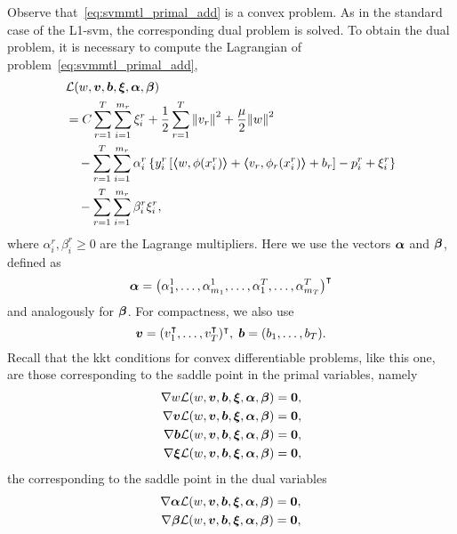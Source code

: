 Observe that~\eqref{eq:svmmtl_primal_add} is a convex problem. As in the standard case of the L1-\acrshort{svm}, the corresponding dual problem is solved. To obtain the dual problem, it is necessary to compute the Lagrangian of problem~\eqref{eq:svmmtl_primal_add},
\begin{equation}\label{eq:svmmtl_lagrangian_add}
    \begin{aligned}
        & \lagr({w}, \fv{v}, \fv{b}, \fv{\xi}, \fv{\alpha}, \fv{\beta}) \\
        &= C \sum_{r= 1}^T \sum_{i=1}^{m_r} {\xi_{i}^r} + \frac{1}{2} \sum_{r= 1}^T{\norm{{v}_r}^2} + \frac{\mu}{2} {\norm{{w}}}^2 \\
        &\quad -  \sum_{r= 1}^T \sum_{i=1}^{m_r} \alpha_i^r \left\lbrace y_{i}^r \left[ \dotp{w}{\phi(x_{i}^r)} + \dotp{{v}_r}{\phi_r(x_{i}^r)} + b_r \right] - p_{i}^r + \xi_{i}^r  \right\rbrace \\
        &\quad -  \sum_{r= 1}^T \sum_{i=1}^{m_r} \beta_i^r \xi_i^r ,
    \end{aligned}
\end{equation}
where $\alpha_i^r, \beta_i^r \geq 0$ are the Lagrange multipliers. Here we use the vectors $\bm{\alpha}$ and $\bm{\beta}$, defined as
\begin{equation}
    \nonumber
    \bm{\alpha} = \left(\alpha_1^1, \ldots, \alpha_{m_1}^1, \ldots, \alpha_1^T, \ldots, \alpha_{m_T}^T\right)^\intercal
\end{equation}
and analogously for $\bm{\beta}$. For compactness, we also use
$$ \bm{v} = (v_1^\intercal, \ldots, v_T^\intercal)^\intercal,\; \bm{b} = (b_1, \ldots, b_T).$$
Recall that the \acrshort{kkt} conditions for convex differentiable problems, like this one, are those corresponding to the saddle point in the primal variables, namely
\begin{align}
    \nabla w \mathcal{L}({w}, \bm{v}, \bm{b}, \bm{\xi}, \bm{\alpha}, \bm{\beta}) = \bm{0}, \nonumber \\
    \nabla \bm{v} \mathcal{L}({w}, \bm{v}, \bm{b}, \bm{\xi}, \bm{\alpha}, \bm{\beta}) = \bm{0}, \nonumber \\
    \nabla \bm{b} \mathcal{L}({w}, \bm{v}, \bm{b}, \bm{\xi}, \bm{\alpha}, \bm{\beta}) = \bm{0}, \nonumber \\
    \nabla \bm{\xi} \mathcal{L}({w}, \bm{v}, \bm{b}, \bm{\xi}, \bm{\alpha}, \bm{\beta}) = \bm{0} , \nonumber
\end{align}
the corresponding to the saddle point in the dual variables
\begin{align}
    \nabla \bm{\alpha} \mathcal{L}({w}, \bm{v}, \bm{b}, \bm{\xi}, \bm{\alpha}, \bm{\beta}) = \bm{0}, \nonumber \\
    \nabla \bm{\beta} \mathcal{L}({w}, \bm{v}, \bm{b}, \bm{\xi}, \bm{\alpha}, \bm{\beta}) = \bm{0} , \nonumber
\end{align}
